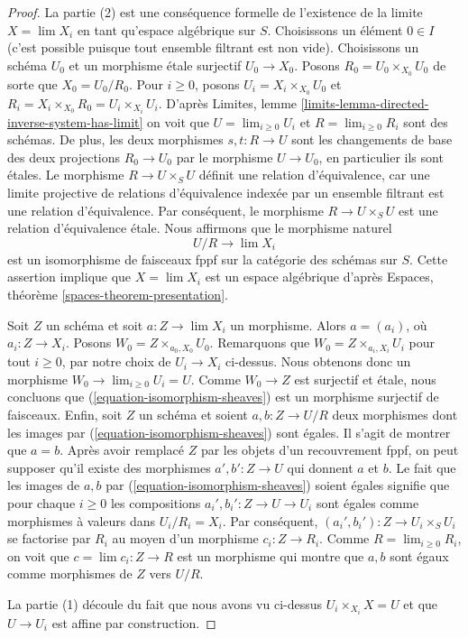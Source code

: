 \begin{proof}
La partie (2) est une conséquence formelle de l'existence de la
limite $X = \lim X_i$ en tant qu'espace algébrique sur $S$.
Choisissons un élément $0 \in I$ (c'est possible puisque tout ensemble filtrant est non vide).
Choisissons un schéma $U_0$ et un morphisme
\'etale surjectif $U_0 \to X_0$. Posons $R_0 = U_0 \times_{X_0} U_0$
de sorte que $X_0 = U_0/R_0$. Pour $i \geq 0$, posons
$U_i = X_i \times_{X_0} U_0$ et
$R_i = X_i \times_{X_0} R_0 = U_i \times_{X_i} U_i$.
D'après Limites, lemme \ref{limits-lemma-directed-inverse-system-has-limit}
on voit que $U = \lim_{i \geq 0} U_i$ et $R = \lim_{i \geq 0} R_i$
sont des schémas. De plus, les deux morphismes $s, t : R \to U$ sont les
changements de base des deux projections $R_0 \to U_0$ par le morphisme
$U \to U_0$, en particulier ils sont \'etales. Le morphisme $R \to U \times_S U$
définit une relation d'équivalence, car une limite projective de relations d'équivalence
indexée par un ensemble filtrant est une relation d'équivalence. Par conséquent, le morphisme
$R \to U \times_S U$ est une relation d'équivalence \'etale. Nous affirmons que
le morphisme naturel
\begin{equation}
\label{equation-isomorphism-sheaves}
U/R \longrightarrow \lim X_i
\end{equation}
est un isomorphisme de faisceaux fppf sur la catégorie des schémas sur $S$.
Cette assertion implique que $X = \lim X_i$ est un espace algébrique
d'après Espaces, théorème \ref{spaces-theorem-presentation}.

\medskip\noindent
Soit $Z$ un schéma et soit $a : Z \to \lim X_i$ un morphisme.
Alors $a = (a_i)$, où $a_i : Z \to X_i$. Posons $W_0 = Z \times_{a_0, X_0} U_0$.
Remarquons que $W_0 = Z \times_{a_i, X_i} U_i$ pour tout $i \geq 0$, par notre
choix de $U_i \to X_i$ ci-dessus. Nous obtenons donc un morphisme
$W_0 \to \lim_{i \geq 0} U_i = U$. Comme $W_0 \to Z$ est surjectif
et \'etale, nous concluons que (\ref{equation-isomorphism-sheaves})
est un morphisme surjectif de faisceaux. Enfin, soit
$Z$ un schéma et soient $a, b : Z \to U/R$ deux morphismes
dont les images par (\ref{equation-isomorphism-sheaves}) sont égales.
Il s'agit de montrer que $a = b$.
Après avoir remplacé $Z$ par les objets d'un recouvrement fppf,
on peut supposer qu'il existe des morphismes $a', b' : Z \to U$ qui
donnent $a$ et $b$. Le fait que les images de $a, b$ par
(\ref{equation-isomorphism-sheaves}) soient égales signifie que
pour chaque $i \geq 0$ les compositions $a_i', b_i' : Z \to U \to U_i$
sont égales comme morphismes à valeurs dans $U_i/R_i = X_i$. Par conséquent,
$(a_i', b_i') : Z \to U_i \times_S U_i$ se factorise par
$R_i$ au moyen d'un morphisme $c_i : Z \to R_i$. Comme
$R = \lim_{i \geq 0} R_i$, on voit que $c = \lim c_i : Z \to R$
est un morphisme qui montre que $a, b$ sont égaux comme morphismes
de $Z$ vers $U/R$.

\medskip\noindent
La partie (1) découle du fait que nous avons vu ci-dessus
$U_i \times_{X_i} X = U$ et que $U \to U_i$ est affine par
construction.
\end{proof}

